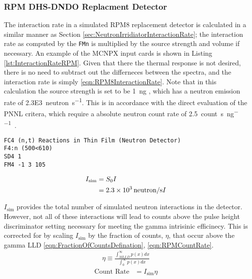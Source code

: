 \documentclass[draftcls,onecolumn]{IEEEtran}
\begin{document}
\subsubsection{RPM DHS-DNDO Replacment Detector}

The interaction rate in a simulated RPM8 replacement detector is calculated in a similar manner as Section \ref{sec:NeutronIrridiatorInteractionRate}; the interaction rate as computed by the \verb+FMn+ is multiplied by the source strength and volume if necessary.
An example of the MCNPX input cards is shown in Listing \ref{lst:InteractionRateRPM}.
Given that there the thermal response is not desired, there is no need to subtract out the differneces between the spectra, and the interaction rate is simply \eqref{eqn:RPM8InteractionRate}.
Note that in this calculation the source strength is set to be \SI{1}{\nano\gram} , which has a neutron emission rate of \SI{2.3E3}{neutron\per\second}.
This is in accordance with the direct evaluation of the PNNL critera, which require a absolute neutron count rate of \SI{2.5}{count\per\second\per\nano\gram{}}.
\begin{lstlisting}[caption={[RPM8 ${}^{6}\text{Li}\left(\text{n},\text{t}\right)\alpha$ Reaction Rate]RPM8 ${}^{6}\text{Li}\left(\text{n},\text{t}\right)\alpha$ Reaction Rate. The detector is all of the layers of cell 500 inside universe 610. This tally is multiplied by an SD card to normalize by the volume},label={lst:InteractionRateRPM}]
FC4 (n,t) Reactions in Thin Film (Neutron Detector)
F4:n (500<610)
SD4 1
FM4 -1 3 105
\end{lstlisting}
\begin{align}
  \label{eqn:RPM8InteractionRate}
  I_{\text{sim}} &= S_0 I \\
  &= \SI{2.3E3}{neutron\per\second} I
\end{align}

$I_{\text{sim}}$ provides the total number of simulated neutron interactions in the detector.
However, not all of these interactions will lead to counts above the pulse height discriminator setting necessary for meeting the gamma intrisinic efficinecy.
This is corrected for by scaling $I_{\text{sim}}$ by the fraction of counts, $\eta$, that occur above the gamma LLD \eqref{eqn:FractionOfCountsDefination}, \eqref{eqn:RPMCountRate}.
\begin{align}
  \label{eqn:FractionOfCountsDefination}
  \eta \equiv \frac{\int_{MLLD}^\infty p(x)dx}{\int_0^\infty p(x)dx}
\end{align}
\begin{align}
 \label{eqn:RPMCountRate}
 \text{Count Rate} &= I_{\text{sim}} \eta
\end{align}
\end{document}
